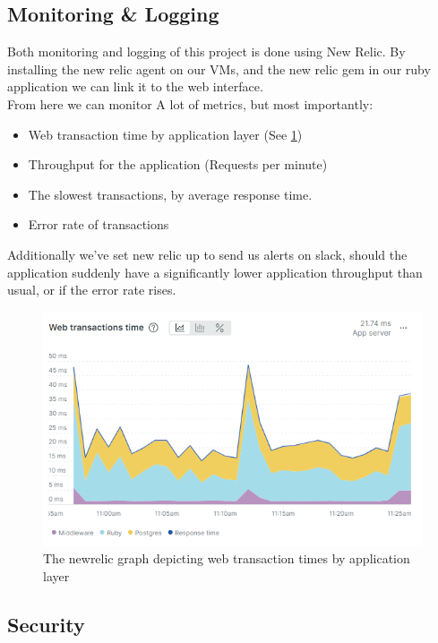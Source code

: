 \documentclass{article}
\begin{document}
\subsection{Monitoring \& Logging}
Both monitoring and logging of this project is done using New Relic. By installing the new relic agent on our VMs, and the new relic gem in our ruby application we can link it to the web interface. 
\\From here we can monitor A lot of metrics, but most importantly:
\begin{itemize}
    \item Web transaction time by application layer (See \ref{fig:transaction-times})
    \item Throughput for the application (Requests per minute) 
    \item The slowest transactions, by average response time.
    \item Error rate of transactions
\end{itemize}
Additionally we've set new relic up to send us alerts on slack, should the application suddenly have a significantly lower application throughput than usual, or if the error rate rises.
\begin{figure}[H]
    \centering
    \includegraphics[width=\textwidth]{images/new-relic-transactions.png}
    \caption{The newrelic graph depicting web transaction times by application layer}
    \label{fig:transaction-times}
\end{figure}



\subsection{Security}
\end{document}

